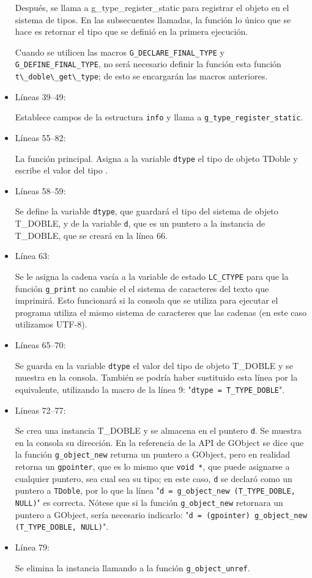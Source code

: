 \begin{itemize}
  Después, se llama a g\_type\_register\_static para registrar el objeto en el sistema de tipos. En las subsecuentes
  llamadas, la función lo único que se hace es retornar el tipo que se definió en la primera ejecución.\par
  Cuando se utilicen las macros \texttt{G\_DECLARE\_FINAL\_TYPE} y \texttt{G\_DEFINE\_FINAL\_TYPE}, no será
  necesario definir la función esta función \passthrough{\lstinline!t\_doble\_get\_type!}; de esto se encargarán las macros anteriores.
\item Líneas 39--49:\par
  Establece campos de la estructura \texttt{info} y llama a \texttt{g\_type\_register\_static}.
\item Líneas 55--82:\par
  La función principal. Asigna a la variable \texttt{dtype} el tipo de objeto \textsf{TDoble} y escribe el valor
  del tipo .
\item Líneas 58--59:\par
  Se define la variable \texttt{dtype}, que guardará el tipo del sistema de objeto \textsf{T\_DOBLE}, y de la
  variable \texttt{d}, que es un puntero a la instancia de \textsf{T\_DOBLE}, que se creará en la línea 66.
\item Línea 63:\par
  Se le asigna la cadena vacía a la variable de estado \texttt{LC\_CTYPE} para que la función
  \texttt{g\_print} no cambie el el sistema de caracteres del texto que imprimirá.
  Esto funcionará si la consola que se utiliza para ejecutar el programa utiliza el mismo sistema de caracteres
  que las cadenas (en este caso utilizamos UTF-8).
\item Líneas 65--70:\par
  Se guarda en la variable \texttt{dtype} el valor del tipo de objeto \textsf{T\_DOBLE} y se muestra en la consola.
  También se podría haber sustituido esta línea por la equivalente, utilizando la macro de la línea 9:
  "\texttt{dtype = T\_TYPE\_DOBLE}".
\item Líneas 72--77:\par
  Se crea una instancia \textsf{T\_DOBLE} y se almacena en el puntero \texttt{d}. Se muestra en la consola su
  dirección. En la referencia de la API de \textsf{GObject} se dice que la función
  \texttt{g\_object\_new} returna un puntero a \textsf{GObject}, pero en realidad retorna un
  \texttt{gpointer}, que es lo mismo que \texttt{void *}, que puede asignarse a cualquier puntero, sea cual sea
  su tipo; en este caso, \texttt{d} se declaró como un puntero a \texttt{TDoble}, por lo que la línea
  "\texttt{d = g\_object\_new (T\_TYPE\_DOBLE, NULL)}" es correcta. Nótese que si la función
  \texttt{g\_object\_new} retornara un puntero a \textsf{GObject}, sería necesario indicarlo:
  "\texttt{d = (gpointer) g\_object\_new (T\_TYPE\_DOBLE, NULL)}".
\item Línea 79:\par
  Se elimina la instancia llamando a la función \texttt{g\_object\_unref}.
\end{itemize}

